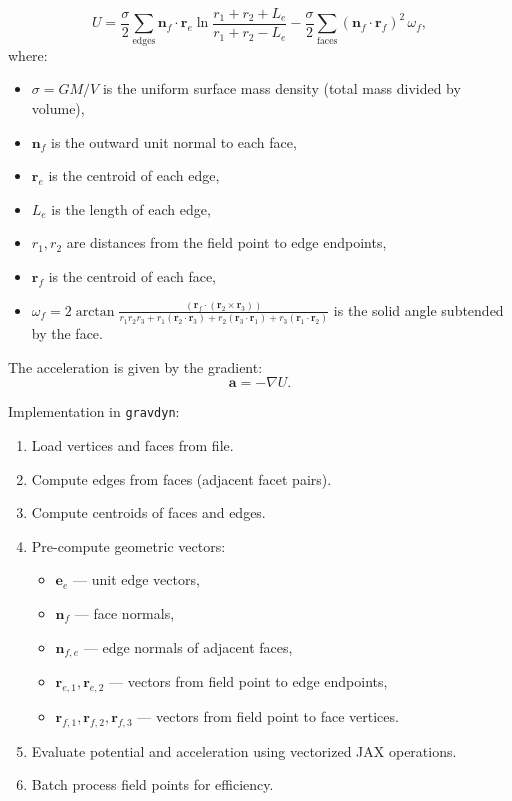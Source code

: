\documentclass[a4paper,12pt]{article}
\begin{document}
\begin{equation}
U = \frac{\sigma}{2} \sum_{\text{edges}} \mathbf{n}_f \cdot \mathbf{r}_e \ln\frac{r_1 + r_2 + L_e}{r_1 + r_2 - L_e} - \frac{\sigma}{2} \sum_{\text{faces}} (\mathbf{n}_f \cdot\mathbf{r}_f)^2 \, \omega_f,
\end{equation}
where:
\begin{itemize}
    \item $\sigma = GM/V$ is the uniform surface mass density (total mass divided by volume),
    \item $\mathbf{n}_f$ is the outward unit normal to each face,
    \item $\mathbf{r}_e$ is the centroid of each edge,
    \item $L_e$ is the length of each edge,
    \item $r_1, r_2$ are distances from the field point to edge endpoints,
    \item $\mathbf{r}_f$ is the centroid of each face,
    \item $\omega_f = 2\arctan\frac{ (\mathbf{r}_f \cdot (\mathbf{r}_2 \times \mathbf{r}_3) )}{ r_1 r_2 r_3 + r_1 (\mathbf{r}_2\cdot\mathbf{r}_3) + r_2 (\mathbf{r}_3\cdot\mathbf{r}_1) + r_3 (\mathbf{r}_1\cdot\mathbf{r}_2) }$ is the solid angle subtended by the face.
\end{itemize}

The acceleration is given by the gradient:
\begin{equation}
\mathbf{a} = -\nabla U .
\end{equation}

Implementation in \texttt{gravdyn}:

\begin{enumerate}
    \item Load vertices and faces from file.
    \item Compute edges from faces (adjacent facet pairs).
    \item Compute centroids of faces and edges.
    \item Pre-compute geometric vectors:
    \begin{itemize}
        \item $\mathbf{e}_e$ — unit edge vectors,
        \item $\mathbf{n}_f$ — face normals,
        \item $\mathbf{n}_{f,e}$ — edge normals of adjacent faces,
        \item $\mathbf{r}_{e,1}, \mathbf{r}_{e,2}$ — vectors from field point to edge endpoints,
        \item $\mathbf{r}_{f,1}, \mathbf{r}_{f,2}, \mathbf{r}_{f,3}$ — vectors from field point to face vertices.
    \end{itemize}
    \item Evaluate potential and acceleration using vectorized JAX operations.
    \item Batch process field points for efficiency.
\end{enumerate}
\end{document}
